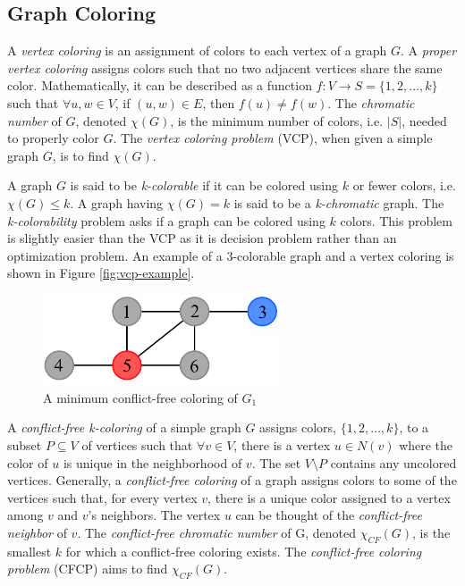 \documentclass{sig-alternate}
\begin{document}
\subsection{Graph Coloring}
\label{sec:coloring}
A \emph{vertex coloring} is an assignment of colors to each vertex of a graph $G$. A \emph{proper vertex coloring} assigns colors such that no two adjacent vertices share the same color. Mathematically, it can be described as a function $f : V \rightarrow S = \{1, 2, \dots, k\}$ such that $\forall u,w \in V$, if $(u,w) \in E$, then $f(u) \neq f(w)$. The \emph{chromatic number} of $G$, denoted $\chi(G)$, is the minimum number of colors, i.e. $|S|$, needed to properly color $G$. The \emph{vertex coloring problem} (VCP), when given a simple graph $G$, is to find $\chi(G)$. \cite{bondy1976graph}

A graph $G$ is said to be \emph{k-colorable} if it can be colored using $k$ or fewer colors, i.e. $\chi(G) \leq k$. A graph having $\chi(G) = k$ is said to be a \emph{k-chromatic} graph. The \emph{k-colorability} problem asks if a graph can be colored using $k$ colors. This problem is slightly easier than the VCP as it is decision problem rather than an optimization problem. An example of a 3-colorable graph and a vertex coloring is shown in Figure \ref{fig:vcp-example}.

\begin{figure}[h]
	\centering
	\includegraphics[width=7cm]{../figures/example-cfcp.pdf}
	\caption{A minimum conflict-free coloring of $G_1$}\label{fig:cfcp-example}
\end{figure}

A \emph{conflict-free k-coloring} of a simple graph $G$ assigns colors, $\{1, 2, \ldots, k\}$, to a subset $P \subseteq V$ of vertices such that $\forall v \in V$, there is a vertex $u \in N(v)$ where the color of $u$ is unique in the neighborhood of $v$. The set $V \setminus P$ contains any uncolored vertices. Generally, a \emph{conflict-free coloring} of a graph assigns colors to some of the vertices such that, for every vertex $v$, there is a unique color assigned to a vertex among $v$ and $v$'s neighbors. The vertex $u$ can be thought of the \emph{conflict-free neighbor} of $v$. The \emph{conflict-free chromatic number} of G, denoted $\chi_{CF}(G)$, is the smallest $k$ for which a conflict-free coloring exists. The \emph{conflict-free coloring problem} (CFCP) aims to find $\chi_{CF}(G)$. \cite{abel2017three}
\end{document}
